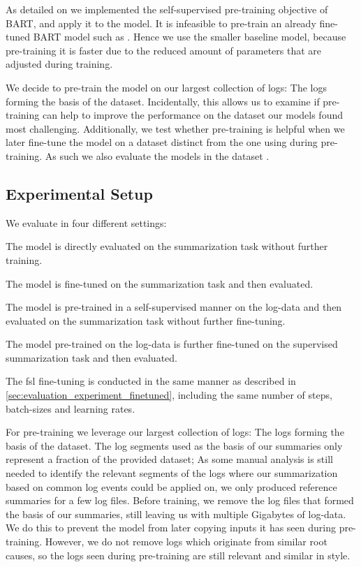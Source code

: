 As detailed on  we implemented the self-supervised pre-training objective of BART,
and apply it to the  model.
It is infeasible to pre-train an already fine-tuned BART model such as .
Hence we use the smaller  baseline model, because pre-training it is faster due to the reduced amount of parameters that are adjusted during training.

We decide to pre-train the model on our largest collection of logs: The logs forming the basis of the \telco{} dataset.
Incidentally, this allows us to examine if pre-training can help to improve the performance on the dataset our models found most challenging.
Additionally, we test whether pre-training is helpful when we later fine-tune the model on a dataset distinct from the one using during pre-training.
As such we also evaluate the models in the \logsummary{} dataset .

\subsection{Experimental Setup}

We evaluate  in four different settings:
\begin{description}[parsep=0pt,topsep=0pt]
\item[\acf{zsl}]
      The model is directly evaluated on the summarization task without further training.
\item[\acf{fsl}]
      The model is fine-tuned on the summarization task and then evaluated.
\item[\acf{prezsl}]
      The model is pre-trained in a self-supervised manner on the log-data
      and then evaluated on the summarization task without further fine-tuning.
\item[\acf{prefsl}]
      The model pre-trained on the log-data is further fine-tuned on the supervised summarization task and then evaluated.
\end{description}
The \ac{fsl} fine-tuning is conducted in the same manner as described in \autoref{sec:evaluation_experiment_finetuned},
including the same number of steps, batch-sizes and learning rates.

For pre-training we leverage our largest collection of logs: The logs forming the basis of the \telco{} dataset.
The log segments used as the basis of our summaries only represent a fraction of the provided dataset;
As some manual analysis is still needed to identify the relevant segments of the logs where our summarization based on common log events could be applied on,
we only produced reference summaries for a few log files.
Before training, we remove the log files that formed the basis of our summaries,
still leaving us with multiple Gigabytes of log-data.
We do this to prevent the model from later copying inputs it has seen during pre-training.
However, we do not remove logs which originate from similar root causes,
so the logs seen during pre-training are still relevant and similar in style.

